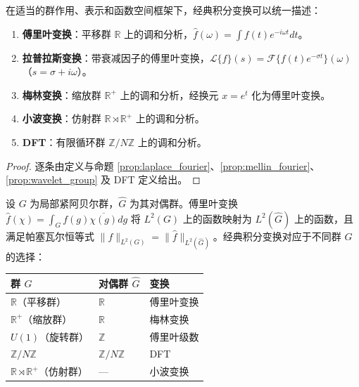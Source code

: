 \begin{theorem}[经典积分变换作为群上调和分析]\label{thm:classical_transforms_unified}
在适当的群作用、表示和函数空间框架下，经典积分变换可以统一描述：
\begin{enumerate}[label=(\roman*)]
    \item \textbf{傅里叶变换}：平移群 $\mathbb{R}$ 上的调和分析，$\hat{f}(\omega) = \int f(t) e^{-i\omega t} dt$。
    \item \textbf{拉普拉斯变换}：带衰减因子的傅里叶变换，$\mathcal{L}\{f\}(s) = \mathcal{F}\{f(t)e^{-\sigma t}\}(\omega)$（$s = \sigma + i\omega$）。
    \item \textbf{梅林变换}：缩放群 $\mathbb{R}^+$ 上的调和分析，经换元 $x = e^t$ 化为傅里叶变换。
    \item \textbf{小波变换}：仿射群 $\mathbb{R} \rtimes \mathbb{R}^+$ 上的调和分析。
    \item \textbf{DFT}：有限循环群 $\mathbb{Z}/N\mathbb{Z}$ 上的调和分析。
\end{enumerate}
\end{theorem}

\begin{proof}
逐条由定义与命题 \ref{prop:laplace_fourier}、\ref{prop:mellin_fourier}、\ref{prop:wavelet_group} 及 DFT 定义给出。
\end{proof}

\begin{remark}[群上调和分析的一般框架]\label{rem:harmonic_general}
设 $G$ 为局部紧阿贝尔群，$\widehat{G}$ 为其对偶群。傅里叶变换 $\hat{f}(\chi) = \int_G f(g) \overline{\chi(g)} dg$ 将 $L^2(G)$ 上的函数映射为 $L^2(\widehat{G})$ 上的函数，且满足帕塞瓦尔恒等式 $\|f\|_{L^2(G)} = \|\hat{f}\|_{L^2(\widehat{G})}$。经典积分变换对应于不同群 $G$ 的选择：
\begin{center}
\begin{tabular}{@{}p{4cm}p{4cm}p{5cm}@{}}
\toprule
群 $G$ & 对偶群 $\widehat{G}$ & 变换 \\
\midrule
$\mathbb{R}$（平移群） & $\mathbb{R}$ & 傅里叶变换 \\
$\mathbb{R}^+$（缩放群） & $\mathbb{R}$ & 梅林变换 \\
$U(1)$（旋转群） & $\mathbb{Z}$ & 傅里叶级数 \\
$\mathbb{Z}/N\mathbb{Z}$ & $\mathbb{Z}/N\mathbb{Z}$ & DFT \\
$\mathbb{R} \rtimes \mathbb{R}^+$（仿射群） & — & 小波变换 \\
\bottomrule
\end{tabular}
\end{center}
\end{remark}

